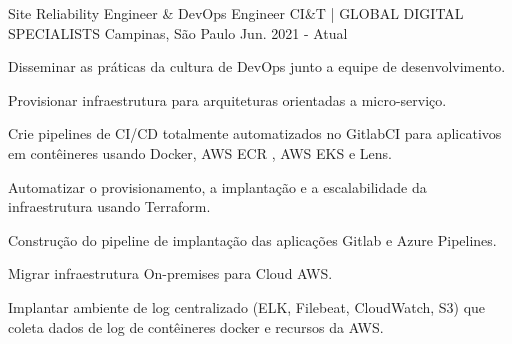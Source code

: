 

\begin{cventries}

  \cventry
    {Site Reliability Engineer \& DevOps Engineer} %
    {CI\&T | GLOBAL DIGITAL SPECIALISTS} %
    {Campinas, São Paulo} %
    {Jun. 2021 - Atual} %
    {
      \begin{cvitems} %
        \item {Disseminar as práticas da cultura de DevOps junto a equipe de desenvolvimento.}
        \item {Provisionar infraestrutura para arquiteturas orientadas a micro-serviço.}
        \item {Crie pipelines de CI/CD totalmente automatizados no GitlabCI para aplicativos em contêineres usando Docker, AWS ECR , AWS EKS e Lens.}
        \item {Automatizar o provisionamento, a implantação e a escalabilidade da infraestrutura usando Terraform.}
        \item {Construção do pipeline de implantação das aplicações Gitlab e Azure Pipelines.}
        \item {Migrar infraestrutura On-premises para Cloud AWS.}
        \item {Implantar ambiente de log centralizado (ELK, Filebeat, CloudWatch, S3) que coleta dados de log de contêineres docker e recursos da AWS.}
      \end{cvitems}
    }
  \break


\end{cventries}
